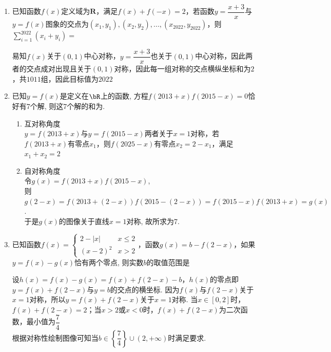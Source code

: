 \begin{enumerate}
\begin{enumerate}
    \item 已知函数$f(x)$定义域为$\mathbf{R}$，满足$f(x) + f(-x) = 2$，若函数$y = \dfrac{x+3}{x}$与$y = f(x)$图象的交点为$(x_1, y_1), (x_2, y_2), ..., (x_{2022}, y_{2022})$，则$\sum_{i=1}^{2022}(x_i+y_i) = $
    \begin{jieda}
        易知$f(x)$关于$(0, 1)$中心对称，$y = \dfrac{x+3}{x}$也关于$(0, 1)$中心对称，因此两者的交点成对出现且关于$(0, 1)$对称，因此每一组对称的交点横纵坐标和为$2$，共$1011$组，因此目标值为$2022$
    \end{jieda}
    \item 已知$y=f(x)$是定义在$\bR$上的函数, 方程$f(2013+x)f(2015-x)=0$恰好有7个解, 则这7个解的和为. 
    \begin{jieda}
    \begin{enumerate}
        \item 互对称角度 \\
        $y = f(2013+x)$与$y = f(2015-x)$两者关于$x = 1$对称，若$f(2013+x)$有零点$x_1$，则$f(2025-x)$有零点$x_2 = 2-x_1$，满足$x_1+x_2 = 2$
        \item 自对称角度 \\
        令$g(x)=f(2013+x)f(2015-x)$, \\
        则$g(2-x)=f(2013+(2-x))f(2015-(2-x))=f(2015-x)f(2013+x)=g(x)$. \\
        于是$g(x)$的图像关于直线$x=1$对称, 故所求为7. 
    \end{enumerate}
    \end{jieda}
    \item 已知函数$f(x) = \left \{ \begin{array}{ll}
            2 - |x| & x \leq 2 \\
            (x-2)^2 & x > 2
    \end{array}\right.$，函数$g(x) = b - f(2-x)$，如果$y = f(x) - g(x)$恰有两个零点, 则实数$b$的取值范围是
    \begin{jieda}
        设$h(x) = f(x) - g(x) = f(x) + f(2-x) - b$，$h(x)$的零点即$y = f(x) + f(2-x)$与$y = b$的交点的横坐标. 因为$f(x)$与$f(2-x)$关于$x = 1$对称，所以$y = f(x) + f(2-x)$关于$x = 1$对称. 当$x \in [0, 2]$时，$f(x) + f(2-x) = 2$；当$x > 2$或$x < 0$时，$f(x) + f(2-x)$为二次函数，最小值为$\dfrac{7}{4}$ \\
        根据对称性绘制图像可知当$b \in \left\{\dfrac{7}{4}\right\} \cup (2, +\infty)$时满足要求. 
    \end{jieda}
\end{enumerate}

\end{enumerate}
